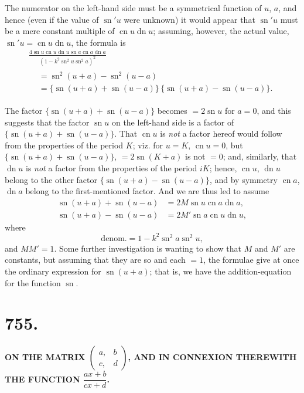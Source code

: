 \documentclass[12pt,a4paper]{article}
\DeclareMathOperator{\sn}{sn}
\DeclareMathOperator{\cn}{cn}
\DeclareMathOperator{\dn}{dn}
\begin{document}
The numerator on the left-hand side must be a symmetrical function of $u$, $a$,
and hence (even if the value of $\sn' u$ were unknown) it would appear that $\sn' u$ must
be a mere constant multiple of $\cn u \dn u$; assuming, however, the actual value,
$\sn' u = \cn u \dn u$, the formula is
%
\begin{multline*}
\frac{4 \sn u \cn u \dn u \sn a \cn a \dn a}
{(1 - k^2 \sn^2 u \sn^2 a)^2} \\
\begin{aligned}
&= \sn^2 (u + a) - \sn^2 (u - a) \\
&= \{ \sn (u + a) + \sn (u - a) \} \, \{ \sn (u + a) - \sn (u - a) \}.
\end{aligned}
\end{multline*}

The factor $\{ \sn (u + a) + \sn (u - a) \}$ becomes $= 2 \sn u$ for $a = 0$,
and this suggests that the factor $\sn u$ on the left-hand side is a factor of
$\{ \sn (u + a) + \sn (u - a) \}$. That $\cn u$ is \textit{not} a factor hereof
would follow from the properties of the period $K$; viz. for $u = K$, $\cn u = 0$,
but $\{ \sn (u + a) + \sn (u - a) \}$, $= 2 \sn (K + a)$ is not $= 0$;
and, similarly, that $\dn u$ is \textit{not} a factor from the properties of the
period $iK$; hence, $\cn u$, $\dn u$ belong to the other factor
$\{ \sn (u + a) - \sn (u - a) \}$, and by symmetry $\cn a$, $\dn a$ belong to the
first-mentioned factor. And we are thus led to assume
%
\begin{align*}
\sn (u + a) + \sn (u - a) &= 2M \sn u \cn a \dn a, \\
\sn (u + a) - \sn (u - a) &= 2M' \sn a \cn u \dn u,
\end{align*}
%
where
%
\[
\text{denom.} = 1 - k^2 \sn^2 a \sn^2 u,
\]
%
and $MM' = 1$. Some further investigation is wanting to show that $M$ and $M'$
are constants, but assuming that they are so and each $= 1$, the formulae give
at once the ordinary expression for $\sn (u + a)$; that is, we have the
addition-equation for the function $\sn$.

\newpage


\section*{755.}

\begin{center}
\textbf{ON THE MATRIX $\left(\begin{array}{c|c} a, & b \\ \hline c, & d \end{array}\right)$,
AND IN CONNEXION THEREWITH}\\[4pt]
\textbf{THE FUNCTION $\dfrac{ax+b}{cx+d}$.}
\end{center}
\end{document}
